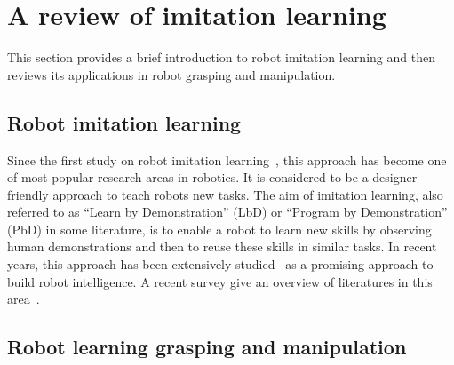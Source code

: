 \section{A review of imitation learning}
\label{cha2:sec2}

This section provides a brief introduction to robot imitation learning and then reviews its applications in robot grasping and manipulation.

\subsection{Robot imitation learning}
\label{cha2:sec2:learning}
Since the first study on robot imitation learning~\citep{friedrich1996robot}, this approach has become one of most popular research areas in robotics. It is considered to be a designer-friendly approach to teach robots new tasks. The aim of imitation learning, also referred to as ``Learn by Demonstration'' (LbD) or ``Program by Demonstration'' (PbD) in some literature, is to enable a robot to learn new skills by observing human demonstrations and then to reuse these skills in similar tasks. In recent years, this approach has been extensively studied~\citep{dillmann2004teaching,calinon2007learning,calinon2008robot,kulic2012incremental} as a promising approach to build robot intelligence. A recent survey give an overview of literatures in this area~\citep{argall2009survey}.

\subsection{Robot learning grasping and manipulation }
\label{cha2:sec2:grasping-learning}



